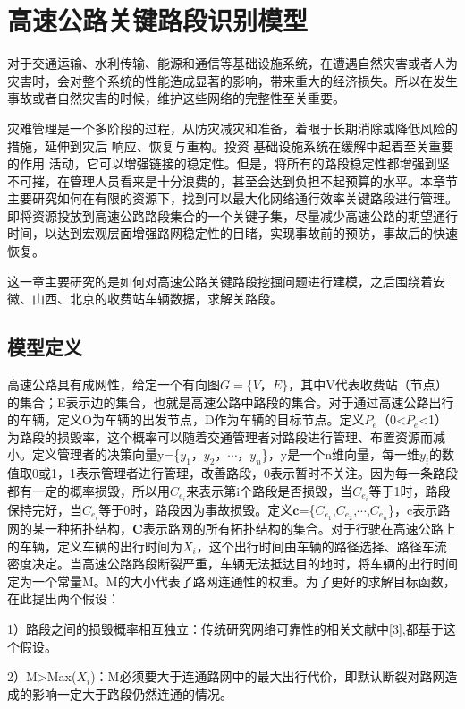 
\chapter{高速公路关键路段识别模型}
		对于交通运输、水利传输、能源和通信等基础设施系统，在遭遇自然灾害或者人为灾害时，会对整个系统的性能造成显著的影响，带来重大的经济损失。所以在发生事故或者自然灾害的时候，维护这些网络的完整性至关重要。

		灾难管理是一个多阶段的过程，从防灾减灾和准备，着眼于长期消除或降低风险的措施，延伸到灾后 响应、恢复与重构。投资 基础设施系统在缓解中起着至关重要的作用 活动，它可以增强链接的稳定性。但是，将所有的路段稳定性都增强到坚不可摧，在管理人员看来是十分浪费的，甚至会达到负担不起预算的水平。本章节主要研究如何在有限的资源下，找到可以最大化网络通行效率关键路段进行管理。即将资源投放到高速公路路段集合的一个关键子集，尽量减少高速公路的期望通行时间，以达到宏观层面增强路网稳定性的目睹，实现事故前的预防，事故后的快速恢复。

		这一章主要研究的是如何对高速公路关键路段挖掘问题进行建模，之后围绕着安徽、山西、北京的收费站车辆数据，求解关路段。

		\section{模型定义}
			高速公路具有成网性，给定一个有向图$G=\{V，E\}$，其中V代表收费站（节点）的集合；E表示边的集合，也就是高速公路中路段的集合。对于通过高速公路出行的车辆，定义O为车辆的出发节点，D作为车辆的目标节点。定义$P_e$（0<$P_e$<1）为路段的损毁率，这个概率可以随着交通管理者对路段进行管理、布置资源而减小。定义管理者的决策向量y=\{$y_1$，$y_2$，$\cdots$，$y_n$\}，y是一个n维向量，每一维$y_i$的数值取0或1，1表示管理者进行管理，改善路段，0表示暂时不关注。因为每一条路段都有一定的概率损毁，所以用$C_{e_i}$来表示第i个路段是否损毁，当$C_{e_i}$等于1时，路段保持完好，当$C_{e_i}$等于0时，路段因为事故损毁。定义$\bm{c}$=\{$C_{e_1}$,$C_{e_2}$,$\cdots$,$C_{e_n}$\}，c表示路网的某一种拓扑结构，$\bm{C}$表示路网的所有拓扑结构的集合。对于行驶在高速公路上的车辆，定义车辆的出行时间为$X_i$，这个出行时间由车辆的路径选择、路径车流密度决定。当高速公路路段断裂严重，车辆无法抵达目的地时，将车辆的出行时间定为一个常量M。M的大小代表了路网连通性的权重。为了更好的求解目标函数，在此提出两个假设：

			1）路段之间的损毁概率相互独立：传统研究网络可靠性的相关文献中[3],都基于这个假设。

			2）M>Max($X_i$)：M必须要大于连通路网中的最大出行代价，即默认断裂对路网造成的影响一定大于路段仍然连通的情况。


